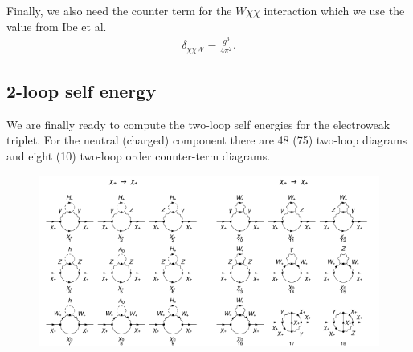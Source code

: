\documentclass[11pt]{article}
\begin{document}
Finally, we also need the counter term for the $W\chi\chi$ interaction which we use the value from Ibe et al.
\begin{align}
\delta_{\chi\chi W} = \frac{g^3}{4 \pi^2}.
\end{align}

\subsection{2-loop self energy}

We are finally ready to compute the two-loop self energies for the electroweak triplet.  For the neutral (charged) component there are 48 (75) two-loop diagrams and eight (10) two-loop order counter-term diagrams.  


\begin{figure}[h!]
\center
\includegraphics[width=0.5\textwidth]{diagrams_F[1]_2_1.pdf}\includegraphics[width=0.5\textwidth]{diagrams_F[1]_2_2.pdf}

\end{figure}
\end{document}
